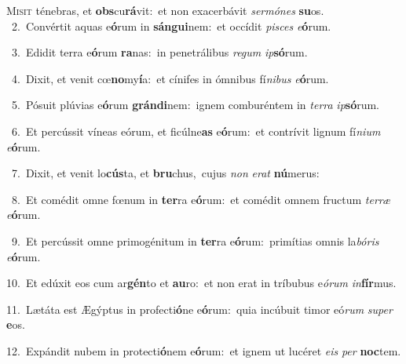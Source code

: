 \lettrine{\initial\textcolor{\initialcolor}{M}}{isit} ténebras, et \textbf{obs}\-cu\-\textbf{rá}\-vit:~\star et non exacerbávit \textit{ser}\-\textit{mó}\textit{nes} \textbf{su}\-os.\\
{\numbfont\textcolor{\numbcolor}{~2.}}~Convértit aquas e\-\textbf{ó}\-rum in \textbf{sán}\-\textbf{gui}nem:~\star et occídit \textit{pi}\-\textit{sces} \textit{e}\-\textbf{ó}rum.\par
{\numbfont\textcolor{\numbcolor}{~3.}}~Edidit terra e\-\textbf{ó}\-rum \textbf{ra}\-nas:~\star in penetrálibus \textit{re}\-\textit{gum} \textit{ip}\-\textbf{só}rum.\par
{\numbfont\textcolor{\numbcolor}{~4.}}~Dixit, et venit cœ\-\textbf{no}\-my\-\textbf{í}\-a:~\star et cínifes in ómnibus fí\-\textit{ni}\-\textit{bus} \textit{e}\-\textbf{ó}rum.\par
{\numbfont\textcolor{\numbcolor}{~5.}}~Pósuit plúvias e\-\textbf{ó}\-rum \textbf{grán}\-\textbf{di}nem:~\star ignem comburéntem in \textit{ter}\-\textit{ra} \textit{ip}\-\textbf{só}rum.\par
{\numbfont\textcolor{\numbcolor}{~6.}}~Et percússit víneas eórum, et ficúlne\textbf{as} e\-\textbf{ó}\-rum:~\star et contrívit lignum fí\-\textit{ni}\-\textit{um} \textit{e}\-\textbf{ó}rum.\par
{\numbfont\textcolor{\numbcolor}{~7.}}~Dixit, et venit lo\-\textbf{cús}\-ta, et \textbf{bru}\-chus,~\star cujus \textit{non} \textit{e}\-\textit{rat} \textbf{nú}\-merus:\par
{\numbfont\textcolor{\numbcolor}{~8.}}~Et comédit omne fœnum in \textbf{ter}\-ra e\-\textbf{ó}\-rum:~\star et comédit omnem fructum \textit{ter}\-\textit{ræ} \textit{e}\-\textbf{ó}rum.\par
{\numbfont\textcolor{\numbcolor}{~9.}}~Et percússit omne primogénitum in \textbf{ter}\-ra e\-\textbf{ó}\-rum:~\star primítias omnis la\-\textit{bó}\-\textit{ris} \textit{e}\-\textbf{ó}rum.\par
{\numbfont\textcolor{\numbcolor}{10.}}~Et edúxit eos cum ar\-\textbf{gén}\-to et \textbf{au}\-ro:~\star et non erat in tríbubus e\-\textit{ó}\-\textit{rum} \textit{in}\-\textbf{fír}mus.\par
{\numbfont\textcolor{\numbcolor}{11.}}~Lætáta est Ægýptus in profecti\-\textbf{ó}\-ne e\-\textbf{ó}\-rum:~\star quia incúbuit timor eó\textit{rum} \textit{su}\-\textit{per} \textbf{e}\-os.\par
{\numbfont\textcolor{\numbcolor}{12.}}~Expándit nubem in protecti\-\textbf{ó}\-nem e\-\textbf{ó}\-rum:~\star et ignem ut lucéret \textit{e}\-\textit{is} \textit{per} \textbf{noc}\-tem.\par
